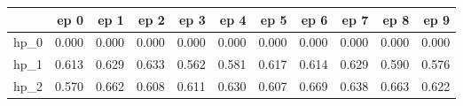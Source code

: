 \begin{tabular}{lrrrrrrrrrr}
\toprule
{} &   ep 0 &   ep 1 &   ep 2 &   ep 3 &   ep 4 &   ep 5 &   ep 6 &   ep 7 &   ep 8 &   ep 9 \\
\midrule
hp\_0 &  0.000 &  0.000 &  0.000 &  0.000 &  0.000 &  0.000 &  0.000 &  0.000 &  0.000 &  0.000 \\
hp\_1 &  0.613 &  0.629 &  0.633 &  0.562 &  0.581 &  0.617 &  0.614 &  0.629 &  0.590 &  0.576 \\
hp\_2 &  0.570 &  0.662 &  0.608 &  0.611 &  0.630 &  0.607 &  0.669 &  0.638 &  0.663 &  0.622 \\
\bottomrule
\end{tabular}
